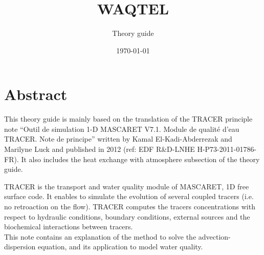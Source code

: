 \documentclass[Waqtel]{../../data/TelemacDoc} %
\begin{document}
\let\cleardoublepage\clearpage
\title{WAQTEL}
\subtitle{Theory guide}
\version{\telmaversion}
\date{\today}
\maketitle
\clearpage




\pagestyle{empty} %

\tableofcontents%


\pagestyle{fancy} %

\thispagestyle{empty}

\chapter*{Abstract}
This theory guide is mainly based on the translation of the TRACER principle note
``Outil de simulation 1-D MASCARET V7.1. Module de qualité d'eau TRACER. Note de principe''
written by Kamal El-Kadi-Abderrezak and Marilyne Luck and published in 2012
\cite{elkadi_tracer_2012} (ref: EDF R\&D-LNHE H-P73-2011-01786-FR).
It also includes the heat exchange with atmosphere subsection of the  theory guide.

TRACER is the transport and water quality module of MASCARET, 1D free surface code.
It enables to simulate the evolution of several coupled tracers
(i.e. no retroaction on the flow).
TRACER computes the tracers concentrations with respect to hydraulic conditions,
boundary conditions, external sources and the biochemical interactions between tracers.\\

This note contains an explanation of the method to solve the advection-dispersion equation,
and its application to model water quality.
\end{document}
